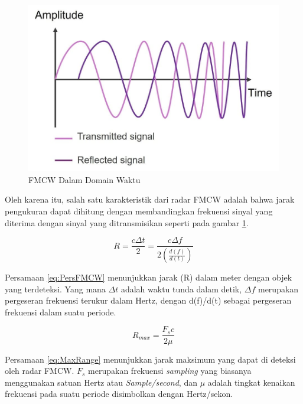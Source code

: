 \begin{figure}
	\begin{center}
		\includegraphics[scale=0.4]{pics/bab2/txRxWave.jpg}
		\caption[FMCW Dalam Domain Waktu]{FMCW Dalam Domain Waktu}
		\label{pic:FMCWTime}
	\end{center}
\end{figure}

Oleh karena itu, salah satu karakteristik dari radar FMCW adalah bahwa jarak pengukuran dapat dihitung dengan membandingkan frekuensi sinyal yang diterima dengan sinyal yang ditransmisikan seperti pada gambar \ref{pic:FMCWTime}.   

\begin{equation} 
	R = \frac{c \Delta{t}}{2} = \frac{c \Delta{f}}{2(\frac{d(f)}{d(t)})}
	\label{eq:PersFMCW}
\end{equation}

Persamaan \ref{eq:PersFMCW} menunjukkan jarak (R) dalam meter dengan objek yang terdeteksi. Yang mana $\Delta{t}$ adalah waktu tunda dalam detik, $\Delta{f}$ merupakan pergeseran frekuensi terukur dalam Hertz, dengan d(f)/d(t) sebagai pergeseran frekuensi dalam suatu periode. 

\begin{equation}
	R_{max} = \frac{F_{s} c}{2 \mu}
	\label{eq:MaxRange}
\end{equation}

Persamaan \ref{eq:MaxRange} menunjukkan jarak maksimum yang dapat di deteksi oleh radar FMCW. $F_{s}$ merupakan frekuensi \textit{sampling} yang biasanya menggunakan satuan Hertz atau \textit{Sample/second}, dan $\mu$ adalah tingkat kenaikan frekuensi pada suatu periode disimbolkan dengan Hertz/sekon.

